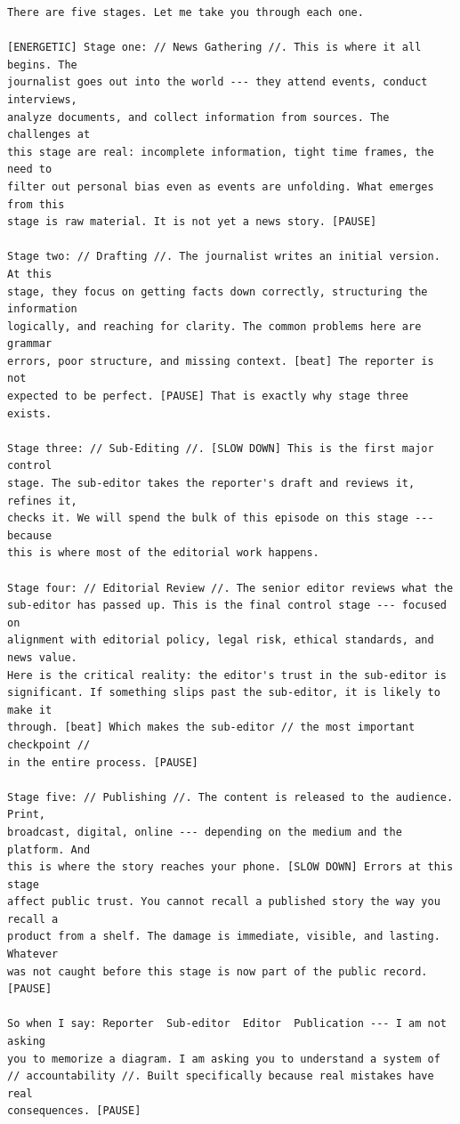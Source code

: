 {\begin{Verbatim}
There are five stages. Let me take you through each one.

[ENERGETIC] Stage one: // News Gathering //. This is where it all begins. The
journalist goes out into the world --- they attend events, conduct interviews,
analyze documents, and collect information from sources. The challenges at
this stage are real: incomplete information, tight time frames, the need to
filter out personal bias even as events are unfolding. What emerges from this
stage is raw material. It is not yet a news story. [PAUSE]

Stage two: // Drafting //. The journalist writes an initial version. At this
stage, they focus on getting facts down correctly, structuring the information
logically, and reaching for clarity. The common problems here are grammar
errors, poor structure, and missing context. [beat] The reporter is not
expected to be perfect. [PAUSE] That is exactly why stage three exists.

Stage three: // Sub-Editing //. [SLOW DOWN] This is the first major control
stage. The sub-editor takes the reporter's draft and reviews it, refines it,
checks it. We will spend the bulk of this episode on this stage --- because
this is where most of the editorial work happens.

Stage four: // Editorial Review //. The senior editor reviews what the
sub-editor has passed up. This is the final control stage --- focused on
alignment with editorial policy, legal risk, ethical standards, and news value.
Here is the critical reality: the editor's trust in the sub-editor is
significant. If something slips past the sub-editor, it is likely to make it
through. [beat] Which makes the sub-editor // the most important checkpoint //
in the entire process. [PAUSE]

Stage five: // Publishing //. The content is released to the audience. Print,
broadcast, digital, online --- depending on the medium and the platform. And
this is where the story reaches your phone. [SLOW DOWN] Errors at this stage
affect public trust. You cannot recall a published story the way you recall a
product from a shelf. The damage is immediate, visible, and lasting. Whatever
was not caught before this stage is now part of the public record. [PAUSE]

So when I say: Reporter  Sub-editor  Editor  Publication --- I am not asking
you to memorize a diagram. I am asking you to understand a system of
// accountability //. Built specifically because real mistakes have real
consequences. [PAUSE]



\end{Verbatim}}
